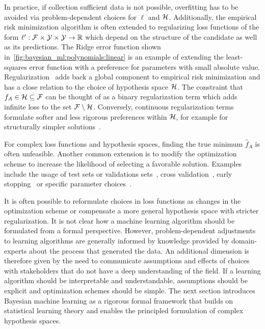 In practice, if collection sufficient data is not possible, overfitting has to be avoided via problem-dependent choices for $\ell$ and $\mathcal{H}$.
Additionally, the empirical risk minimization algorithm is often extended to regularizing loss functions of the form $\ell^\prime : \mathcal{F} \times \mathcal{Y} \times \mathcal{Y} \to \mathbb{R}$ which depend on the structure of the candidate as well as its predictions.
The Ridge error function shown in~\cref{fig:bayesian_ml:polynomials:linear} is an example of extending the least-squares error function with a preference for parameters with small absolute value.
Regularization~\parencite{oates_modern_2019} adds back a global component to empirical risk minimization and has a close relation to the choice of hypothesis space $\mathcal{H}$.
The constraint that $f_A \in \mathcal{H} \subseteq \mathcal{F}$ can be thought of as a binary regularization term which adds infinite loss to the set $\mathcal{F} \setminus \mathcal{H}$.
Conversely, continuous regularization terms formulate softer and less rigorous preferences within $\mathcal{H}$, for example for structurally simpler solutions~\parencite{bishop_christoph_pattern_2007,thorburn_occams_1915}.

For complex loss functions and hypothesis spaces, finding the true minimum $\hat{f}_A$ is often unfeasible.
Another common extension is to modify the optimization scheme to increase the likelihood of selecting a favorable solution.
Examples include the usage of test sets or validations sets~\parencite{bishop_christoph_pattern_2007}, cross validation~\parencite{stone_cross-validatory_1974}, early stopping~\parencite{morgan_generalization_1990} or specific parameter choices~\parencite{daniely_toward_2016}.

It is often possible to reformulate choices in loss functions as changes in the optimization scheme or compensate a more general hypothesis space with stricter regularization.
It is not clear how a machine learning algorithm should be formulated from a formal perspective.
However, problem-dependent adjustments to learning algorithms are generally informed by knowledge provided by domain-experts about the process that generated the data.
An additional dimension is therefore given by the need to communicate assumptions and effects of choices with stakeholders that do not have a deep understanding of the field.
If a learning algorithm should be interpretable and understandable, assumptions should be explicit and optimization schemes should be simple.
The next section introduces Bayesian machine learning as a rigorous formal framework that builds on statistical learning theory and enables the principled formulation of complex hypothesis spaces.

